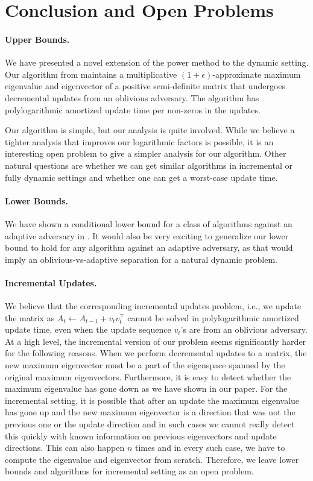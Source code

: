 \documentclass[11pt]{article}
\newcommand\vv{\boldsymbol{\mathit{v}}}
\renewcommand\AA{\boldsymbol{\mathit{A}}}
\begin{document}
 	
	

\section{Conclusion and Open Problems}\label{sec:open}


\paragraph{Upper Bounds.}
We have presented a novel extension of the power method to the dynamic setting. Our algorithm from  maintains a multiplicative $(1+\epsilon)$-approximate maximum eigenvalue and eigenvector of a positive semi-definite matrix that undergoes decremental updates from an oblivious adversary. The algorithm has polylogarithmic amortized update time per non-zeros in the updates. 

Our algorithm is simple, but our analysis is quite involved. While we believe a tighter analysis that improves our logarithmic factors is possible, it is an interesting open problem to give a simpler analysis for our algorithm. 
Other natural questions are whether we can get similar algorithms in incremental or fully dynamic settings and whether one can get a worst-case update time.


\paragraph{Lower Bounds.}
We have shown a conditional lower bound for a class of algorithms against an adaptive adversary in . It would also be very exciting to generalize our lower bound to hold for any algorithm against an adaptive adversary, as that would imply an oblivious-vs-adaptive separation for a natural dynamic problem. 

\paragraph{Incremental Updates.} We believe that the corresponding incremental updates problem, i.e., we update the matrix as $\AA_t \gets \AA_{t-1}+\vv_t\vv_t^{\top}$ cannot be solved in polylogarithmic amortized update time, even when the update sequence $\vv_t$'s are from an oblivious adversary. 
At a high level, the incremental version of our problem seems significantly harder for the following reasons. When we perform decremental updates to a matrix, the new maximum eigenvector must be a part of the eigenspace spanned by the original maximum eigenvectors. Furthermore, it is easy to detect whether the maximum eigenvalue has gone down as we have shown in our paper. For the incremental setting, it is possible that after an update the maximum eigenvalue has gone up and the new maximum eigenvector is a direction that was not the previous one or the update direction and in such cases we cannot really detect this quickly with known information on previous eigenvectors and update directions. This can also happen $n$ times and in every such case, we have to compute the eigenvalue and eigenvector from scratch. Therefore, we leave lower bounds and algorithms for incremental setting as an open problem. 
\end{document}
